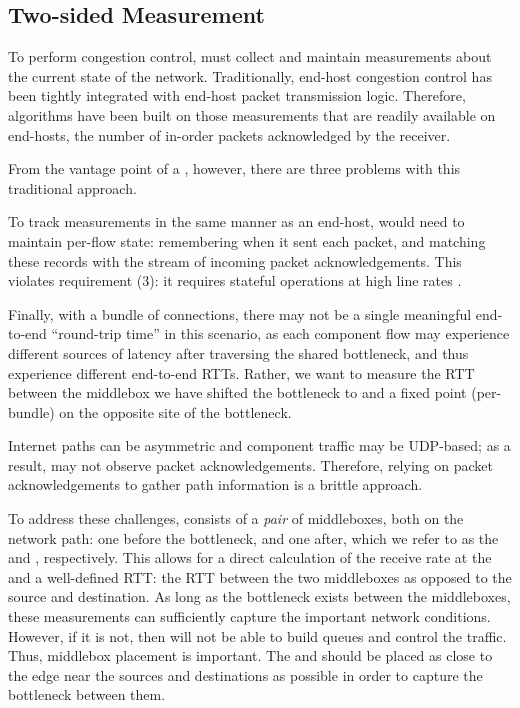 \subsection{Two-sided Measurement}\label{s:design:twosided}
To perform congestion control, \name must collect and maintain measurements about the current state of the network.
Traditionally, end-host congestion control has been tightly integrated with end-host packet transmission logic. 
Therefore, algorithms have been built on those measurements that are readily available on end-hosts, \eg the number of in-order packets acknowledged by the receiver.

From the vantage point of a \name, however, there are three problems with this traditional approach.

 To track measurements in the same manner as an end-host, \name would need to maintain per-flow state: remembering when it sent each packet, and matching these records with the stream of incoming packet acknowledgements. 
This violates requirement (3): it requires stateful operations at high line rates .

 Finally, with a bundle of connections, there may not be a single meaningful end-to-end ``round-trip time'' in this scenario, as each component flow may experience different sources of latency after traversing the shared bottleneck, and thus experience different end-to-end RTTs. 
Rather, we want to measure the RTT between the middlebox we have shifted the bottleneck to and a fixed point (per-bundle) on the opposite site of the bottleneck.

 Internet paths can be asymmetric and component traffic may be UDP-based; as a result, \name may not observe packet acknowledgements. Therefore, relying on packet acknowledgements to gather path information is a brittle approach.
%
\smallskip

To address these challenges, \name consists of a \emph{pair} of middleboxes, both on the network path: one before the bottleneck, and one after, which we refer to as the \textit{\inbox} and \textit{\outbox}, respectively. 
This allows for a direct calculation of the receive rate at the \outbox and a well-defined RTT: the RTT between the two middleboxes as opposed to the source and destination. 
As long as the bottleneck exists between the middleboxes, these measurements can sufficiently capture the important network conditions. 
However, if it is not, then \name will not be able to build queues and control the traffic. Thus, middlebox placement is important. The \inbox and \outbox should be placed as close to the edge near the sources and destinations as possible in order to capture the bottleneck between them.

